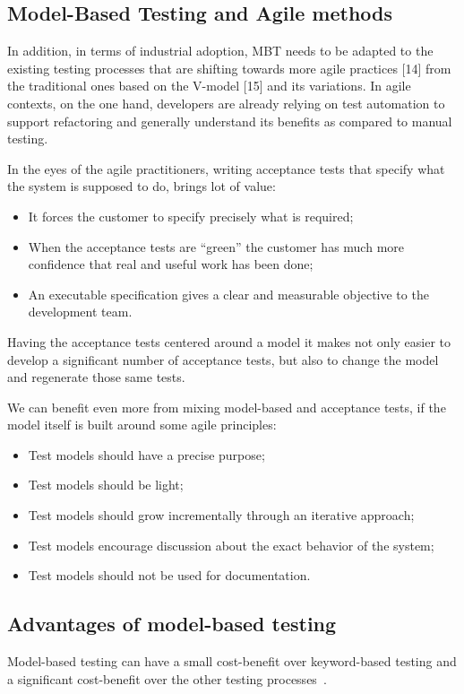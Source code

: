 \subsection{Model-Based Testing and Agile methods}

In addition, in terms of industrial adoption, MBT needs to be adapted to the existing testing processes that are shifting towards more agile practices [14] from the traditional ones based on the V-model [15] and its variations. In agile contexts, on the one hand, developers are already relying on test automation to support refactoring and generally understand its benefits as compared to manual testing. 

In the eyes of the agile practitioners, writing acceptance tests
that specify what the system is supposed to do, brings lot of value:
\begin{itemize}
\item It forces the customer to specify precisely what is required;
\item When the acceptance tests are “green” the customer has much 
more confidence that real and useful work has been done;
\item An executable specification gives a clear and measurable 
objective to the development team.
\end{itemize}

Having the acceptance tests centered around a model it makes 
not only easier to develop a significant number of acceptance tests,
but also to change the model and regenerate those same tests.

We can benefit even more from mixing model-based and acceptance tests, if the model itself is built around some agile principles:
\begin{itemize}
\item Test models should have a precise purpose;
\item Test models should be light; 
\item Test models should grow incrementally through an iterative approach;
\item Test models encourage discussion about the exact behavior of the system;
\item Test models should not be used for documentation.
\end{itemize}

\subsection{Advantages of model-based testing}
Model-based testing can have a small cost-benefit over keyword-based testing and a significant cost-benefit over the other testing processes~\cite{1200168}.

